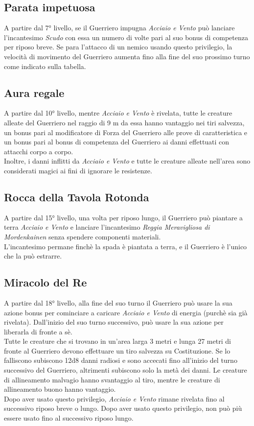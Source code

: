 \subsection{Parata impetuosa}
A partire dal 7° livello, se il Guerriero impugna \textit{Acciaio e Vento} può lanciare l'incantesimo \textit{Scudo} con essa un numero di volte pari al suo bonus di competenza per riposo breve. Se para l'attacco di un nemico usando questo privilegio, la velocità di movimento del Guerriero aumenta fino alla fine del suo prossimo turno come indicato sulla tabella.

\subsection{Aura regale}
A partire dal 10° livello, mentre \textit{Acciaio e Vento} è rivelata, tutte le creature alleate del Guerriero nel raggio di 9 m da essa hanno vantaggio nei tiri salvezza, un bonus pari al modificatore di Forza del Guerriero alle prove di caratteristica e un bonus pari al bonus di competenza del Guerriero ai danni effettuati con attacchi corpo a corpo. \\ Inoltre, i danni inflitti da \textit{Acciaio e Vento} e tutte le creature alleate nell'area sono considerati magici ai fini di ignorare le resistenze.

\subsection{Rocca della Tavola Rotonda}
A partire dal 15° livello, una volta per riposo lungo, il Guerriero può piantare a terra \textit{Acciaio e Vento} e lanciare l'incantesimo \textit{Reggia Meravigliosa di Mordenkainen} senza spendere componenti materiali. \\ L'incantesimo permane finchè la spada è piantata a terra, e il Guerriero è l'unico che la può estrarre.

\subsection{Miracolo del Re}
A partire dal 18° livello, alla fine del suo turno il Guerriero può usare la sua azione bonus per cominciare a caricare \textit{Acciaio e Vento} di energia (purchè sia già rivelata). Dall'inizio del suo turno successivo, può usare la sua azione per liberarla di fronte a sè. \\ Tutte le creature che si trovano in un'area larga 3 metri e lunga 27 metri di fronte al Guerriero devono effettuare un tiro salvezza su Costituzione. Se lo falliscono subiscono 12d8 danni radiosi e sono accecati fino all'inizio del turno successivo del Guerriero, altrimenti subiscono solo la metà dei danni. Le creature di allineamento malvagio hanno svantaggio al tiro, mentre le creature di allineamento buono hanno vantaggio. \\ Dopo aver usato questo privilegio, \textit{Acciaio e Vento} rimane rivelata fino al successivo riposo breve o lungo. Dopo aver usato questo privilegio, non può più essere usato fino al successivo riposo lungo.